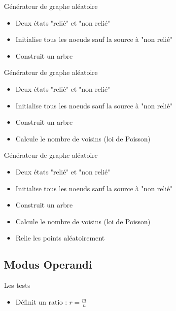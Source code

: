 \documentclass[hyperref={},
xcolor={dvipsnames,svgnames,table},10pt]{beamer}
\begin{document}
\begin{frame}{Générateur de graphe aléatoire}
	\begin{itemize}
		\item Deux états "relié" et "non relié"
		\item Initialise tous les noeuds sauf la source à "non relié"
		\item Construit un arbre
	\end{itemize}
\end{frame}

\begin{frame}{Générateur de graphe aléatoire}
	\begin{itemize}
		\item Deux états "relié" et "non relié"
		\item Initialise tous les noeuds sauf la source à "non relié"
		\item Construit un arbre
		\item Calcule le nombre de voisins (loi de Poisson)
	\end{itemize}
\end{frame}

\begin{frame}{Générateur de graphe aléatoire}
	\begin{itemize}
		\item Deux états "relié" et "non relié"
		\item Initialise tous les noeuds sauf la source à "non relié"
		\item Construit un arbre
		\item Calcule le nombre de voisins (loi de Poisson)
		\item Relie les points aléatoirement
	\end{itemize}
\end{frame}

\subsection{Modus Operandi}

\begin{frame}{Les tests}
	\begin{itemize}
		\item Définit un ratio : $r = \frac{m}{n}$
	\end{itemize}
\end{frame}
\end{document}
